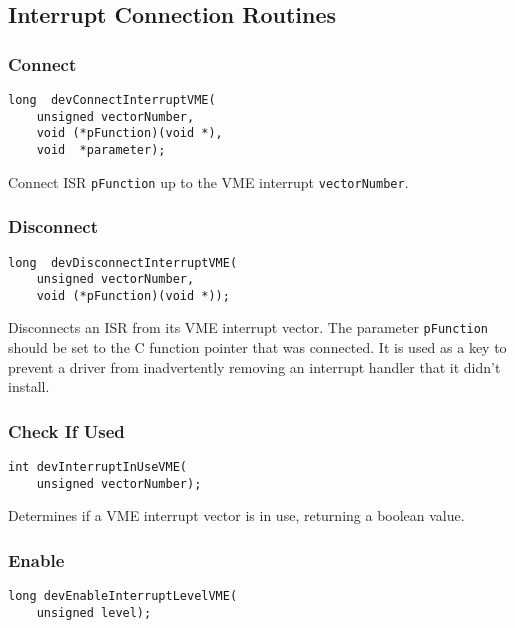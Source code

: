 \subsection{Interrupt Connection Routines}

\subsubsection{Connect}

\begin{verbatim}
long  devConnectInterruptVME(
    unsigned vectorNumber,
    void (*pFunction)(void *),
    void  *parameter);
\end{verbatim}

Connect ISR \verb|pFunction| up to the VME interrupt \verb|vectorNumber|.

\subsubsection{Disconnect}

\begin{verbatim}
long  devDisconnectInterruptVME(
    unsigned vectorNumber,
    void (*pFunction)(void *));
\end{verbatim}

Disconnects an ISR from its VME interrupt vector. The parameter \verb|pFunction| should be set to the C function pointer 
that was connected. It is used as a key to prevent a driver from inadvertently removing an interrupt handler that it didn't 
install.

\subsubsection{Check If Used}

\begin{verbatim}
int devInterruptInUseVME(
    unsigned vectorNumber);
\end{verbatim}

Determines if a VME interrupt vector is in use, returning a boolean value.

\subsubsection{Enable}

\begin{verbatim}
long devEnableInterruptLevelVME(
    unsigned level);
\end{verbatim}

